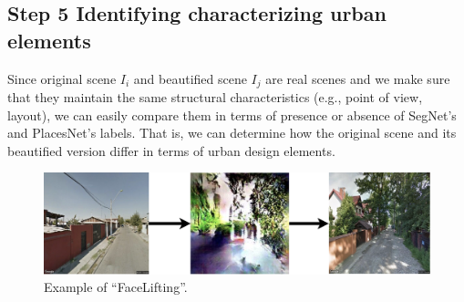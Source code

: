 
\subsection*{Step 5 Identifying  characterizing urban elements}
Since original scene $I_i$ and beautified scene $I_j$ are real scenes and we make sure that they maintain the same structural characteristics (e.g., point of view, layout), we can easily compare them in terms of presence or absence of SegNet's and PlacesNet's labels. That is, we can determine how the original scene and its beautified version differ in terms of urban design elements. 
 
 
\begin{figure}[h]
	\centering
	\includegraphics[width=\linewidth]{Plot/Example.png}
	\caption{Example of ``FaceLifting''.}
	\label{fig:BeautyExample}
\end{figure}

